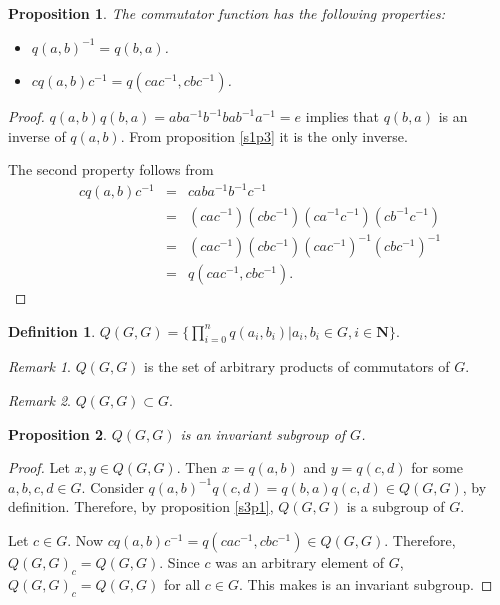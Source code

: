 \documentclass{article}
\theoremstyle{plain}
\numberwithin{thm}{section}
\theoremstyle{plain}
\newtheorem{prop}{Proposition}
\numberwithin{prop}{section}
\theoremstyle{definition}
\newtheorem{defn}{Definition}
\numberwithin{defn}{section}
\theoremstyle{remark}
\newtheorem*{rem}{Remark}
\numberwithin{equation}{section}
\begin{document}
\begin{prop}\label{s5p2}
The commutator function has the following properties:
\begin{itemize}
\item $q(a, b)^{-1} = q(b, a)$.
\item $cq(a, b)c^{-1} = q(cac^{-1}, cbc^{-1})$.
\end{itemize}
\end{prop}
\begin{proof}
$q(a, b)q(b, a) = aba^{-1}b^{-1}bab^{-1}a^{-1} = e$ implies that $q(b, a)$
is an inverse of $q(a, b)$. From proposition \eqref{s1p3} it is the only
inverse.

The second property follows from 
\begin{eqnarray*}
cq(a, b)c^{-1} &=& caba^{-1}b^{-1}c^{-1} \\
 &=& (cac^{-1})(cbc^{-1})(ca^{-1}c^{-1})(cb^{-1}c^{-1}) \\
 &=& (cac^{-1})(cbc^{-1})(cac^{-1})^{-1}(cbc^{-1})^{-1} \\
 &=& q(cac^{-1}, cbc^{-1}).
\end{eqnarray*}
\end{proof}

\begin{defn}\label{s5d2}
$Q(G, G) = \{\prod_{i=0}^nq(a_i, b_i) | a_i, b_i \in G, i \in \mathbf{N}\}$.
\end{defn}

\begin{rem}
$Q(G, G)$ is the set of arbitrary products of commutators of $G$.
\end{rem}
\begin{rem}
$Q(G,G) \subset G$.
\end{rem}

\begin{prop}\label{s5p3}
$Q(G, G)$ is an invariant subgroup of $G$.
\end{prop}
\begin{proof}
Let $x, y \in Q(G, G)$. Then $x = q(a, b)$ and $y = q(c, d)$ for some $a, b,
c, d \in G$. Consider $q(a, b)^{-1}q(c, d) = q(b, a)q(c, d) \in Q(G, G)$, by
definition. Therefore, by proposition \ref{s3p1}, $Q(G, G)$ is a subgroup of
$G$.

Let $c \in G$. Now $cq(a, b)c^{-1} = q(cac^{-1}, cbc^{-1}) \in Q(G, G)$. 
Therefore, $Q(G, G)_c = Q(G, G)$. Since $c$ was an arbitrary element of $G$,
$Q(G, G)_c = Q(G, G)$ for all $c \in G$. This makes is an invariant subgroup.
\end{proof}
\end{document}
